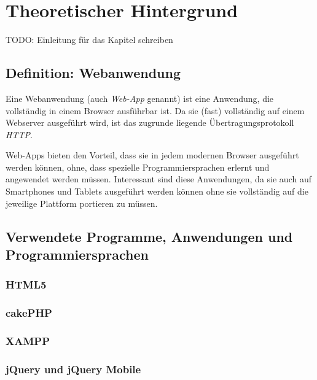 \chapter{Theoretischer Hintergrund}
TODO: Einleitung für das Kapitel schreiben

\section{Definition: Webanwendung}
Eine Webanwendung (auch \emph{Web-App} genannt) ist eine Anwendung, die vollständig in einem Browser ausführbar ist. Da sie (fast) vollständig auf einem Webserver ausgeführt wird, ist das zugrunde liegende Übertragungsprotokoll \emph{HTTP}.\par

Web-Apps bieten den Vorteil, dass sie in jedem modernen Browser ausgeführt werden können, ohne, dass spezielle Programmiersprachen erlernt und angewendet werden müssen. Interessant sind diese Anwendungen, da sie auch auf Smartphones und Tablets ausgeführt werden können ohne sie vollständig auf die jeweilige Plattform portieren zu müssen.

\section{Verwendete Programme, Anwendungen und Programmiersprachen}
\subsection{HTML5}
\subsection{cakePHP}
\subsection{XAMPP}
\subsection{jQuery und jQuery Mobile}